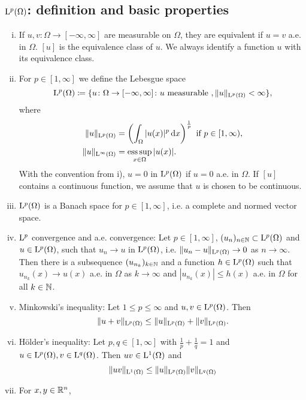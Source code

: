 \subsection{$\mathrm{L}^p(\Omega)$: definition and basic properties}
\begin{enumerate}[i)]
  \item If $u,v \colon \Omega \to [-\infty,\infty]$ are measurable on $\Omega$, they are equivalent if $u = v$ a.e. in $\Omega$.
    $[u]$ is the equivalence class of $u$.
    We always identify a function $u$ with its equivalence class.
  \item For $p \in [1,\infty]$ we define the Lebesgue space
    $$
    \mathrm{L}^p(\Omega) \coloneqq \{ u \colon \Omega \to [-\infty,\infty] \colon u \text{ measurable }, \|u\|_{\mathrm{L}^p(\Omega)} < \infty \},
    $$
    where
    \begin{align*}
      \|u\|_{\Ell^p(\Omega)} &= \left( \int_\Omega |u(x)|^p \d x \right)^{\frac{1}{p}} \text{ if } p \in [1,\infty), \\
        \|u\|_{\Ell^\infty(\Omega)} &= \esssup_{x \in \Omega} |u(x)|.
    \end{align*}
    With the convention from i), $u = 0$ in $\mathrm{L}^p(\Omega)$ if $u = 0$ a.e. in $\Omega$.
    If $[u]$ contains a continuous function, we assume that $u$ is chosen to be continuous.
  \item $\mathrm{L}^p(\Omega)$ is a Banach space for $p \in [1,\infty]$, i.e. a complete and normed vector space.
  \item $\mathrm{L}^p$ convergence and a.e. convergence: Let $p \in [1,\infty]$, $(u_n)_{n \in \mathbb{N}} \subset \mathrm{L}^p(\Omega)$ and $u \in \mathrm{L}^p(\Omega)$, such that $u_n \to u$ in $\mathrm{L}^p(\Omega)$, i.e. $\|u_n - u\|_{\mathrm{L}^p(\Omega)} \to 0$ as $n \to \infty$.
    Then there is a subsequence $(u_{n_k})_{k \in \mathbb{N}}$ and a function $h \in \mathrm{L}^p(\Omega)$ such that $u_{n_k}(x) \to u(x)$ a.e. in $\Omega$ as $k \to \infty$ and $|u_{n_k}(x)| \leq h(x)$ a.e. in $\Omega$ for all $k \in \mathbb{N}$.
  \item Minkowski's inequality: Let $1 \leq p \leq \infty$ and $u,v \in \mathrm{L}^p(\Omega)$.
    Then
    $$
    \|u + v\|_{\mathrm{L}^p(\Omega)} \leq \|u\|_{\mathrm{L}^p(\Omega)}+ \|v\|_{\mathrm{L}^p(\Omega)}.
    $$
  \item Hölder's inequality: Let $p,q \in [1,\infty]$ with $\frac{1}{p} + \frac{1}{q} = 1$ and $u \in \mathrm{L}^p(\Omega), v \in \mathrm{L}^q(\Omega)$. 
    Then $uv \in \mathrm{L}^1(\Omega)$ and
    $$
    \|uv\|_{\mathrm{L}^1(\Omega)} \leq \|u\|_{\mathrm{L}^p(\Omega)} \|v\|_{\mathrm{L}^q(\Omega)}
    $$
  \item For $x,y \in \mathbb{R}^n$,

\end{enumerate}
